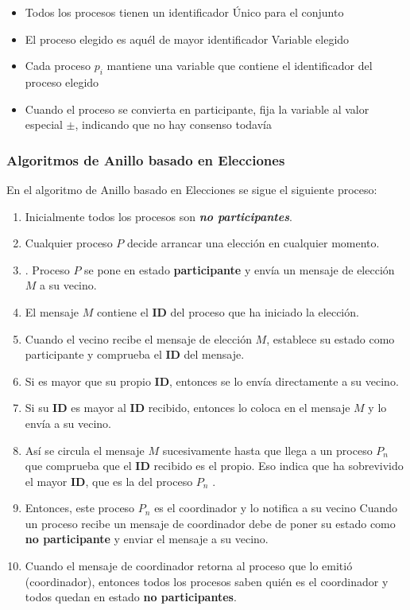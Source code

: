 {\begin{itemize}
		\item   Todos los procesos tienen un identificador 
		Único para el conjunto 
		\item El proceso elegido es aquél de mayor identificador 
		Variable elegido 
		\item Cada proceso $p_{i}$ mantiene una variable que contiene el identificador del proceso elegido 
		\item Cuando el proceso se convierta en participante, fija la variable al valor especial $\pm$, indicando que no hay consenso todavía
		
	\end{itemize}	
 

\subsubsection{Algoritmos de Anillo basado en Elecciones}
 En el algoritmo de Anillo basado en Elecciones  se sigue el siguiente proceso:
 
	\begin{enumerate}
		\item Inicialmente todos los procesos son \textit{\textbf{no participantes}}.
		\item Cualquier proceso $P$ decide arrancar una elección en cualquier momento.
		\item. Proceso $P$ se pone en estado \textbf{participante} y envía un mensaje de elección $M$ a su vecino.
		\item El mensaje $ M$ contiene el \textbf{ID} del proceso que ha iniciado la elección.
		\item Cuando el vecino recibe el mensaje de elección $M$, establece su estado como participante y comprueba el \textbf{ID} del mensaje.
		\item Si es mayor que su propio \textbf{ID}, entonces se lo envía directamente a su vecino.
		\item Si su \textbf{ID} es mayor al \textbf{ID} recibido, entonces lo coloca en el mensaje $M$ y lo envía a su vecino.				
 
		\item Así se circula el mensaje $M$ sucesivamente hasta que llega a un proceso $P_{n}$ que comprueba que el \textbf{ID} recibido es el propio. Eso indica que ha sobrevivido el mayor \textbf{ID}, que es la del proceso  $P_{n}$ .
		\item Entonces, este proceso  $P_{n}$  es el coordinador y lo notifica a su vecino Cuando un proceso recibe un mensaje de coordinador debe de poner su estado como \textbf{no participante }y enviar el mensaje a su vecino.
		\item Cuando el mensaje de coordinador retorna al proceso que lo emitió (coordinador), entonces todos los procesos saben quién es el coordinador y todos quedan en estado \textbf{no participantes}.
	\end{enumerate}		
	
}

